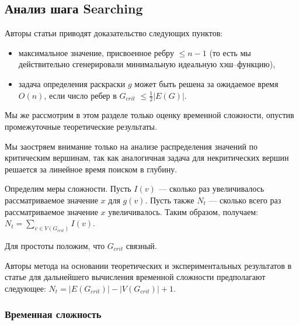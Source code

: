 \documentclass[specialist,
               substylefile = spbu.rtx,
               subf,href,colorlinks=true, 12pt]{disser}
\begin{document}
\subsection{Анализ шага Searching}
Авторы статьи приводят доказательство следующих пунктов: 

\begin{itemize}
\item максимальное значение, присвоенное ребру $\leq n - 1$ (то есть мы действительно сгенерировали минимальную идеальную хэш--функцию),
\item задача определения раскраски $g$ может быть решена за ожидаемое время $\mathit{O}(n)$, если число ребер в $G_{crit}$ $\leq \frac{1}{2}|E(G)|$. 
\end{itemize}

Мы же рассмотрим в этом разделе только оценку временной сложности, опустив промежуточные теоретические результаты.

Мы заостряем внимание только на анализе распределения значений по критическим вершинам, так как аналогичная задача для некритических вершин решается за линейное время поиском в глубину.

Определим меры сложности. Пусть $I(v)$ --- сколько раз увеличивалось рассматриваемое значение $x$ для $g(v)$. Пусть также $N_{t}$ --- сколько всего раз рассматриваемое значение $x$ увеличивалось. Таким образом, получаем: $N_{t} = \sum \limits_{v \in V(G_{crit})} I(v)$.

Для простоты положим, что $G_{crit}$ связный. 

Авторы метода на основании теоретических и экспериментальных результатов в статье для дальнейшего вычисления временной сложности предполагают следующее: $N_{t} = |E(G_{crit})| - |V(G_{crit})| + 1$.

\subsubsection{Временная сложность}
\end{document}
